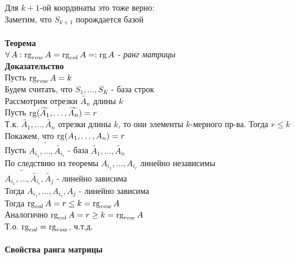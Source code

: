 \documentclass[12pt]{article}
\begin{document}
Для $k+1$-ой координаты это тоже верно:\\
Заметим, что $S_{k+1}$ порождается базой\\\\
\textbf{Теорема}\\
$\forall\,A: \operatorname{rg}_{row} A = \operatorname{rg}_{col} A =: \operatorname{rg} A$ - \textit{ранг матрицы}\\
\textbf{Доказательство}\\
Пусть $\operatorname{rg}_{row} A = k$\\
Будем считать, что $S_1, \ldots, S_K$ - база строк\\
Рассмотрим отрезки $\widetilde{A_n}$ длины $k$\\
Пусть $\operatorname{rg} (\widetilde{A_1}, \ldots, \widetilde{A_n}) = r$\\
Т.к. $\widetilde{A_1}, \ldots, \widetilde{A_n}$ отрезки длины $k$, то они элементы $k$-мерного пр-ва. Тогда $r \leq k$\\
Покажем, что $\operatorname{rg}(A_1, \ldots, A_n) = r$\\
Пусть $\widetilde{A_{i_1}, \ldots, \widetilde{A_{i_r}}}$ - база $\widetilde{A_1}, \ldots, \widetilde{A_n}$\\
По следствию из теоремы $A_{i_1}, \ldots, A_{i_r}$ линейно независимы\\
$\widetilde{A_{i_1}, \ldots, \widetilde{A_{i_r}}}, \widetilde{A_j}$ - линейно зависима\\
Тогда $A_{i_1}, \ldots, A_{i_r}, A_j$ - линейно зависима\\
Тогда $\operatorname{rg}_{col} A = r \leq k = \operatorname{rg}_{row} A$\\
Аналогично $\operatorname{rg}_{col} A = r \geq k = \operatorname{rg}_{row} A$\\
Т.о. $\operatorname{rg}_{col} = \operatorname{rg}_{row}$, ч.т.д.\\\\
\textbf{Свойства ранга матрицы}
\end{document}
